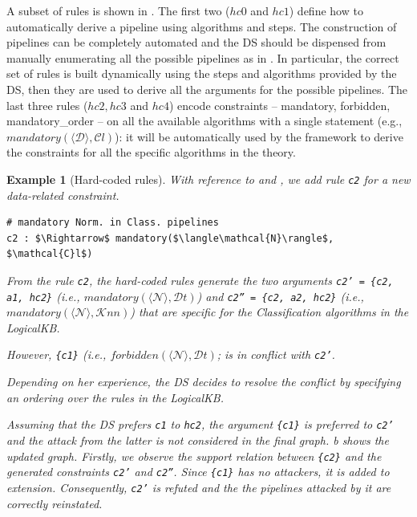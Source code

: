 \documentclass[5p,times]{elsarticle}
\newtheorem{example}{Example}
\newcommand{\mf}[1]{#1}
\begin{document}
A subset of rules is shown in .
The first two ($hc0$ and $hc1$) define how to automatically derive a pipeline using algorithms and steps.
The construction of pipelines can be completely automated and the DS should be dispensed from manually enumerating all the possible pipelines as in .
In particular, the correct set of rules is built dynamically using the steps and algorithms provided by the DS, then they are used to derive all the arguments for the possible pipelines.
The last three rules ($hc2, hc3$ and $hc4$) encode constraints -- mandatory, forbidden, mandatory\_order -- on all the available algorithms with a single statement (e.g., $mandatory(\langle \mathcal{D} \rangle, \mathcal{C}l)$): it will be automatically used by the framework to derive the constraints for all the specific algorithms in the theory.

\begin{example}[Hard-coded rules]
With reference to  and , we add rule \texttt{c2} for a new data-related constraint.
\begin{lstlisting}[mathescape=true]
# mandatory Norm. in Class. pipelines
c2 : $\Rightarrow$ mandatory($\langle\mathcal{N}\rangle$, $\mathcal{C}l$)
\end{lstlisting}
From the rule \texttt{c2}, the hard-coded rules generate the two arguments 
\texttt{c2' = \{c2, a1, hc2\}} (i.e., $mandatory(\langle\mathcal{N}\rangle, \mathcal{D}t)$) and \texttt{c2'' = \{c2, a2, hc2\}} (i.e., $mandatory(\langle\mathcal{N}\rangle, \mathcal{K}nn)$) that are specific for the Classification algorithms in the LogicalKB.

However, \texttt{\{c1\}} (i.e., $forbidden(\langle\mathcal{N}\rangle, \mathcal{D}t)$; is in conflict with \texttt{c2'}.
\mf{
Depending on her experience, the DS decides to resolve the conflict by specifying an ordering over the rules in the LogicalKB.
}
Assuming that the DS prefers \texttt{c1} to \texttt{hc2},
the argument \texttt{\{c1\}} is preferred to \texttt{c2'} and the attack from the latter is not considered in the final graph.
b shows the updated graph.
Firstly, we observe the support relation between \texttt{\{c2\}} and the generated constraints \texttt{c2'} and \texttt{c2''}.
Since \texttt{\{c1\}} has no attackers, it is added to extension.
Consequently, \texttt{c2'} is refuted and the the pipelines attacked by it are correctly reinstated.
\label{ex:hard_coded_rules}
\end{example}
\end{document}
